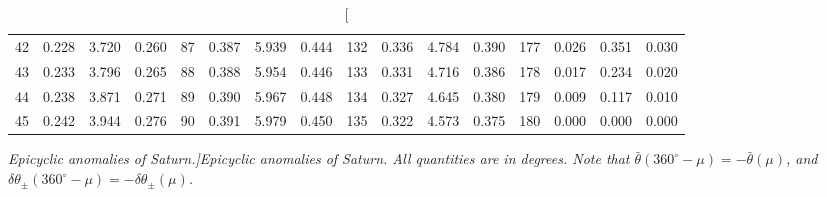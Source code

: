 \begin{table}
{\begin{tabular}{rrrr|rrrr|rrrr|rrrr}
 42 & \tiny{  0.228} &   3.720 & \tiny{  0.260} &  87 & \tiny{  0.387} &   5.939 & \tiny{  0.444} & 132 & \tiny{  0.336} &   4.784 & \tiny{  0.390} & 177 & \tiny{  0.026} &   0.351 & \tiny{  0.030}\\
 43 & \tiny{  0.233} &   3.796 & \tiny{  0.265} &  88 & \tiny{  0.388} &   5.954 & \tiny{  0.446} & 133 & \tiny{  0.331} &   4.716 & \tiny{  0.386} & 178 & \tiny{  0.017} &   0.234 & \tiny{  0.020}\\
 44 & \tiny{  0.238} &   3.871 & \tiny{  0.271} &  89 & \tiny{  0.390} &   5.967 & \tiny{  0.448} & 134 & \tiny{  0.327} &   4.645 & \tiny{  0.380} & 179 & \tiny{  0.009} &   0.117 & \tiny{  0.010}\\
 45 & \tiny{  0.242} &   3.944 & \tiny{  0.276} &  90 & \tiny{  0.391} &   5.979 & \tiny{  0.450} & 135 & \tiny{  0.322} &   4.573 & \tiny{  0.375} & 180 & \tiny{  0.000} &   0.000 & \tiny{  0.000}\\
\end{tabular}}
\caption[\em Epicyclic anomalies of Saturn.]{\em Epicyclic anomalies of Saturn. All quantities are in degrees. Note that $\bar{\theta}(360^\circ-\mu) = -\bar{\theta}(\mu)$, and $\delta\theta_{\pm}(360^\circ-\mu) = -\delta\theta_{\pm}(\mu)$. }\label{vt16}
\end{table}

